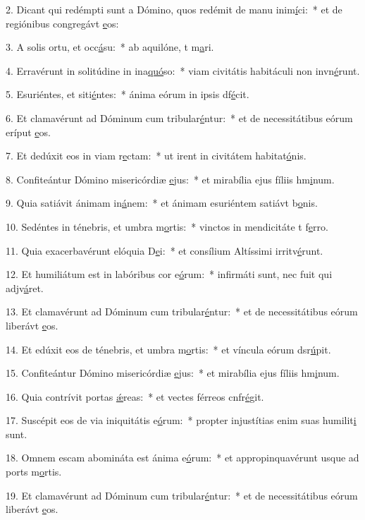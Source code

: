 2. Dicant qui redémpti sunt a Dómino, quos redémit de manu inim\uline{í}ci:~* et de regiónibus congregávt \uline{e}os:\par 
3. A solis ortu, et occ\uline{á}su:~* ab aquilóne, t m\uline{a}ri.\par 
4. Erravérunt in solitúdine in ina\uline{quó}so:~* viam civitátis habitáculi non invn\uline{é}runt.\par 
5. Esuriéntes, et siti\uline{é}ntes:~* ánima eórum in ipsis df\uline{é}cit.\par 
6. Et clamavérunt ad Dóminum cum tribular\uline{é}ntur:~* et de necessitátibus eórum eríput \uline{e}os.\par 
7. Et dedúxit eos in viam r\uline{e}ctam:~* ut irent in civitátem habitat\uline{ó}nis.\par 
8. Confiteántur Dómino misericórdiæ \uline{e}jus:~* et mirabília ejus fíliis hm\uline{i}num.\par 
9. Quia satiávit ánimam in\uline{á}nem:~* et ánimam esuriéntem satiávt b\uline{o}nis.\par 
10. Sedéntes in ténebris, et umbra m\uline{o}rtis:~* vinctos in mendicitáte t f\uline{e}rro.\par 
11. Quia exacerbavérunt elóquia D\uline{e}i:~* et consílium Altíssimi irritv\uline{é}runt.\par 
12. Et humiliátum est in labóribus cor e\uline{ó}rum:~* infirmáti sunt, nec fuit qui adjv\uline{á}ret.\par 
13. Et clamavérunt ad Dóminum cum tribular\uline{é}ntur:~* et de necessitátibus eórum liberávt \uline{e}os.\par 
14. Et edúxit eos de ténebris, et umbra m\uline{o}rtis:~* et víncula eórum dsr\uline{ú}pit.\par 
15. Confiteántur Dómino misericórdiæ \uline{e}jus:~* et mirabília ejus fíliis hm\uline{i}num.\par 
16. Quia contrívit portas \uline{ǽ}reas:~* et vectes férreos cnfr\uline{é}git.\par 
17. Suscépit eos de via iniquitátis e\uline{ó}rum:~* propter injustítias enim suas humilit\uline{i} sunt.\par 
18. Omnem escam abomináta est ánima e\uline{ó}rum:~* et appropinquavérunt usque ad ports m\uline{o}rtis.\par 
19. Et clamavérunt ad Dóminum cum tribular\uline{é}ntur:~* et de necessitátibus eórum liberávt \uline{e}os.\par 

